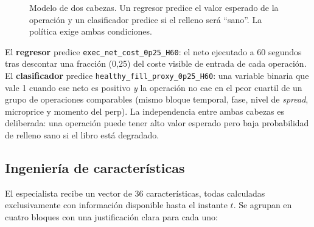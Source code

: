 \begin{figure}[h]
\centering
{}
\caption{Modelo de dos cabezas. Un regresor predice el valor esperado de la operación y un
clasificador predice si el relleno será ``sano''. La política exige ambas condiciones.}
\label{fig:doscabezas}
\end{figure}

El \textbf{regresor} predice \texttt{exec\_net\_cost\_0p25\_H60}: el neto ejecutado a 60
segundos tras descontar una fracción (0,25) del coste visible de entrada de cada operación.
El \textbf{clasificador} predice \texttt{healthy\_fill\_proxy\_0p25\_H60}: una variable
binaria que vale 1 cuando ese neto es positivo \emph{y} la operación no cae en el peor
cuartil de un grupo de operaciones comparables (mismo bloque temporal, fase, nivel de
\emph{spread}, microprice y momento del perp). La independencia entre ambas cabezas es
deliberada: una operación puede tener alto valor esperado pero baja probabilidad de relleno
sano si el libro está degradado.

\subsection{Ingeniería de características}

El especialista recibe un vector de 36 características, todas calculadas exclusivamente con
información disponible hasta el instante $t$. Se agrupan en cuatro bloques con una
justificación clara para cada uno:

